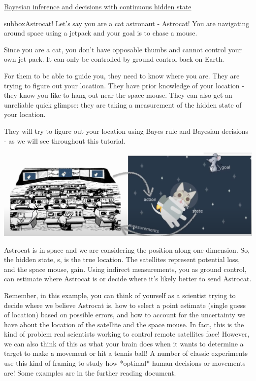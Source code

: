 \begin{textbox}{\href{https://compneuro.neuromatch.io/tutorials/W3D1_BayesianDecisions/student/W3D1_Tutorial2.html}{Bayesian inference and decisions with continuous hidden state } }
\begin{subbox}{subbox}{Astrocat!}
\scriptsize
Let's say you are a cat astronaut - Astrocat! You are navigating around space using a jetpack and your goal is to chase a mouse. 

Since you are a cat, you don't have opposable thumbs and cannot control your own jet pack. It can only be controlled by ground control back on Earth. 

For them to be able to guide you, they need to know where you are. They are trying to figure out your location. They have prior knowledge of your location - they know you like to hang out near the space mouse. They can also get an unreliable quick glimpse: they are taking a measurement of the hidden state of your location.

They will try to figure out your location using Bayes rule and Bayesian decisions - as we will see throughout this tutorial.


\begin{center}
    
\includegraphics[scale=0.1]{Figures/BD/BD_Figure5.png}
\end{center}


Astrocat is in space and we are considering the position along one dimension. So, the hidden state, s, is the true location. The satellites represent potential loss, and the space mouse, gain. Using indirect measurements, you as ground control, can estimate where Astrocat is or decide where it's likely better to send Astrocat.

Remember, in this example, you can think of yourself as a scientist trying to decide where we believe Astrocat is, how to select a point estimate (single guess of location) based on possible errors, and how to account for the uncertainty we have about the location of the satellite and the space mouse. In fact, this is the kind of problem real scientists working to control remote satellites face! However, we can also think of this as what your brain does when it wants to determine a target to make a movement or hit a tennis ball! A number of classic experiments use this kind of framing to study how *optimal* human decisions or movements are! Some examples are in the further reading document.


\end{subbox}
\end{textbox}
